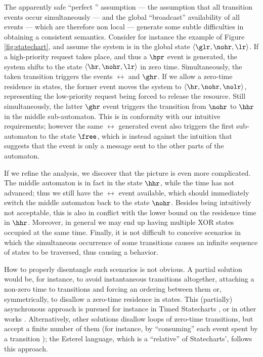 The apparently safe ``perfect '' assumption --- the assumption 
that all transition events occur simultaneously --- and the global 
``broadcast'' availability of all events --- which are therefore 
non local --- generate some subtle difficulties in obtaining a 
consistent semantics. Consider for instance the example of Figure \ref{fig:statechart}, 
and assume the system is in the global state $\langle \glr, \nohr, \lr \rangle$. 
If a high-priority request takes place, and thus a $\hpr$ event 
is generated, the system shifts to the state $\langle \hr, \nohr, \lr \rangle$ in zero time.
Simultaneously, the taken transition triggers the events $\rel$ and $\ghr$.
If we allow a zero-time residence in states, the former event moves the system
to $\langle \hr, \nohr, \nolr \rangle$, representing the low-priority request being forced to release 
the resource. Still simultaneously, the latter $\ghr$ event 
triggers the transition from $\nohr$ to $\hhr$ in the middle sub-automaton.
This is in conformity with our intuitive requirements; however the same $\rel$ generated event also triggers 
the first sub-automaton to the state $\free$, which is instead 
against the intuition that suggests that the event is only a 
message sent to the other parts of the automaton.

If we refine the analysis, we discover that the picture is even 
more complicated. The middle automaton is in fact in the state $\hhr$, 
while the time has not advanced; thus we still have the $\rel$ 
event available, which should immediately switch the middle automaton 
back to the state $\nohr$. Besides being intuitively not 
acceptable, this is also in conflict with the lower bound on 
the residence time in $\hhr$. Moreover, in general we may end 
up having multiple XOR states occupied at the same time. Finally, 
it is not difficult to conceive scenarios in which the simultaneous 
occurrence of some transitions causes an infinite sequence of 
states to be traversed, thus causing a  behavior.

How to properly disentangle such scenarios is not obvious. A 
partial solution would be, for instance, to avoid instantaneous 
transitions altogether, attaching a non-zero time to transitions 
and forcing an ordering between them or, symmetrically, to disallow 
a zero-time residence in states. This (partially) asynchronous 
approach is pursued for instance in Timed Statecharts \cite{KP92}, 
or in other works \cite{Per93}. Alternatively, other solutions disallow 
loops of zero-time transitions, but accept a finite number of 
them (for instance, by ``consuming'' each event spent by a transition \cite{HN96});
the Esterel language, which is a ``relative'' of Statecharts', follows this approach. 


